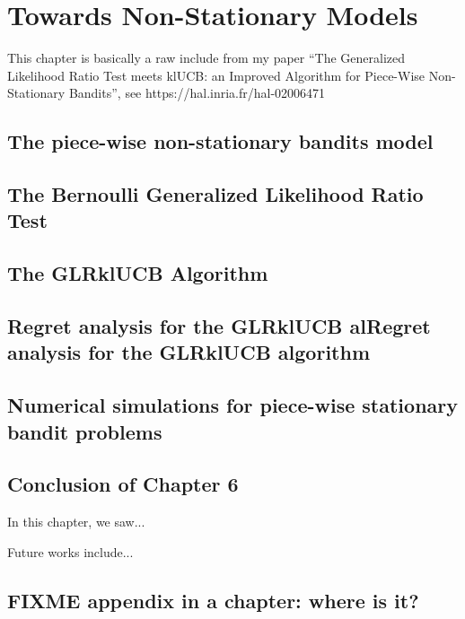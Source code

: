 

\chapter{Towards Non-Stationary Models}
\label{chapter:6}
\minitoc
\newpage
\graphicspath{{2-Chapters/6-Chapter/Images/}}

This chapter is basically a raw include from my paper ``The Generalized Likelihood Ratio Test meets klUCB: an Improved Algorithm for Piece-Wise Non-Stationary Bandits'', see https://hal.inria.fr/hal-02006471


\section{The piece-wise non-stationary bandits model}
\label{sec:6:piecewiseModel}


\section{The Bernoulli Generalized Likelihood Ratio Test}
\label{sec:6:piecewiseModel}


\section{The GLRklUCB Algorithm}
\label{sec:6:piecewiseModel}


\section{Regret analysis for the GLRklUCB alRegret analysis for the GLRklUCB algorithm}
\label{sec:6:piecewiseModel}


\section{Numerical simulations for piece-wise stationary bandit problems}
\label{sec:6:piecewiseModel}


\section{Conclusion of Chapter 6}
\label{sec:6:conclusion}

In this chapter, we saw...

Future works include...



\appendix

\section{FIXME appendix in a chapter: where is it?}
